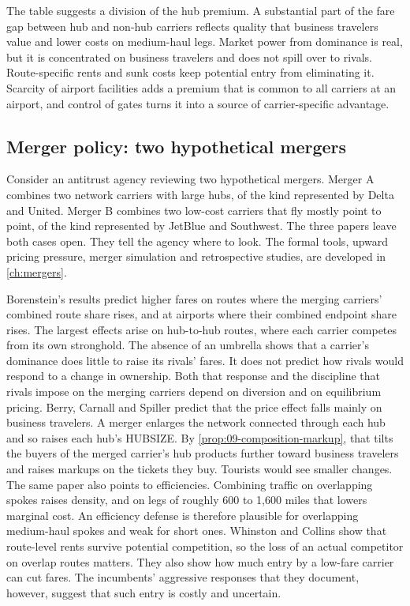 The table suggests a division of the hub premium. A substantial part of the fare gap between hub and non-hub
carriers reflects quality that business travelers value and lower costs on medium-haul legs. Market power
from dominance is real, but it is concentrated on business travelers and does not spill over to rivals.
Route-specific rents and sunk costs keep potential entry from eliminating it. Scarcity of airport facilities
adds a premium that is common to all carriers at an airport, and control of gates turns it into a source of
carrier-specific advantage.

\subsection{Merger policy: two hypothetical mergers}\label{sec:09-synthesis-mergers}

Consider an antitrust agency reviewing two hypothetical mergers. Merger A combines two network carriers with
large hubs, of the kind represented by Delta and United. Merger B combines two low-cost carriers that fly
mostly point to point, of the kind represented by JetBlue and Southwest. The three papers leave both cases
open. They tell the agency where to look. The formal tools, upward pricing pressure, merger simulation and
retrospective studies, are developed in \cref{ch:mergers}.

Borenstein's results predict higher fares on routes where the merging carriers' combined route share rises,
and at airports where their combined endpoint share rises. The largest effects arise on hub-to-hub routes,
where each carrier competes from its own stronghold. The absence of an umbrella shows that a carrier's dominance
does little to raise its rivals' fares. It does not predict how rivals would respond to a change in ownership. Both that
response and the discipline that rivals impose on the merging carriers depend on diversion and on equilibrium pricing.
Berry, Carnall and Spiller predict that the price effect falls mainly on business travelers. A merger enlarges
the network connected through each hub and so raises each hub's HUBSIZE. By
\cref{prop:09-composition-markup}, that tilts the buyers of the merged carrier's hub products further toward
business travelers and raises markups on the tickets they buy. Tourists would see smaller changes. The same
paper also points to efficiencies. Combining traffic on overlapping spokes raises density, and on legs of
roughly 600 to 1,600 miles that lowers marginal cost. An efficiency defense is therefore plausible for
overlapping medium-haul spokes and weak for short ones. Whinston and Collins show that route-level rents
survive potential competition, so the loss of an actual competitor on overlap routes matters. They also show
how much entry by a low-fare carrier can cut fares. The incumbents' aggressive responses that they document,
however, suggest that such entry is costly and uncertain.

